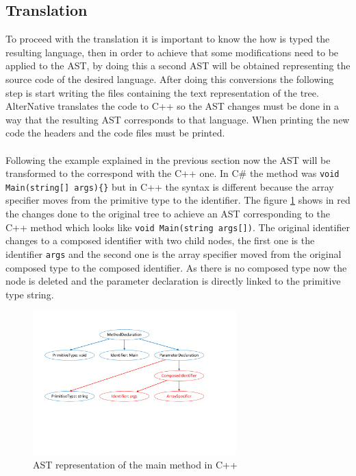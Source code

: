 \subsection{Translation}\label{SS:AN-Process-Translation}
To proceed with the translation it is important to know the how is typed the resulting language, then in order to achieve that some modifications need to be applied to the AST, by doing this a second AST will be obtained representing the source code of the desired language. After doing this conversions the following step is start writing the files containing the text representation of the tree. AlterNative translates the code to C++ so the AST changes must be done in a way that the resulting AST corresponds to that language. When printing the new code the headers and the code files must be printed.
\\
\\
Following the example explained in the previous section now the AST will be transformed to the correspond with the C++ one. In C\# the method was \verb!void Main(string[] args){}! but in C++ the syntax is different because the array specifier moves from the primitive type to the identifier. The figure \ref{fig:AN-AST-Conversions} shows in red the changes done to the original tree to achieve an AST corresponding to the C++ method which looks like \verb!void Main(string args[])!. The original identifier changes to a composed identifier with two child nodes, the first one is the identifier \verb!args! and the second one is the array specifier moved from the original composed type to the composed identifier. As there is no composed type now the node is deleted and the parameter declaration is directly linked to the primitive type string.
\begin{figure}[H]\begin{center}
 \centering
  \captionsetup{justification=centering}
  \includegraphics[width=0.7\textwidth]{pictures/alternative/ast_conversions_cpp}
  \caption{AST representation of the main method in C++\label{fig:AN-AST-Conversions}}
\end{center}\end{figure}

